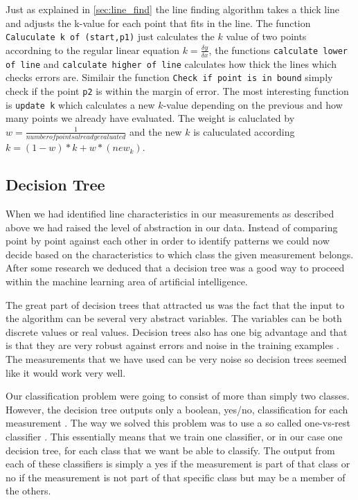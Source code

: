 \documentclass[a4paper, 10pt, conference]{ieeeconf}      %
\begin{document}
Just as explained in \ref{sec:line_find} the line finding algorithm takes a thick line and adjusts the k-value for each point that fits in the line. The function \texttt{Caluculate k of (start,p1)} just calculates the $k$ value of two points accordning to the regular linear equation $k = \frac{\delta y}{\delta x}$, the functions \texttt{calculate lower of line} and \texttt{calculate higher of line} calculates how thick the lines which checks errors are. Similair the function \texttt{Check if point is in bound} simply check if the point \texttt{p2} is within the margin of error. The most interesting function is \texttt{update k} which calculates a new $k$-value depending on the previous and how many points we already have evaluated. The weight is caluclated by $w = \frac{1}{number of points already evaluated}$ and the new $k$ is caluculated according $k = (1-w)*k + w*(new_k)$.

\subsection{Decision Tree}
When we had identified line characteristics in our measurements as described above we had raised the level of abstraction in our data. Instead of comparing point by point against each other in order to identify patterns we could now decide based on the characteristics to which class the given measurement belongs. After some research we deduced that a decision tree was a good way to proceed within the machine learning area of artificial intelligence.

The great part of decision trees that attracted us was the fact that the input to the algorithm can be several very abstract variables. The variables can be both discrete values or real values. Decision trees also has one big advantage and that is that they are very robust against errors and noise in the training examples \cite{ml3}. The measurements that we have used can be very noise so decision trees seemed like it would work very well.

Our classification problem were going to consist of more than simply two classes. However, the decision tree outputs only a boolean, yes/no, classification for each measurement \cite{ml3}. The way we solved this problem was to use a so called one-vs-rest classifier \cite{praml}. This essentially means that we train one classifier, or in our case one decision tree, for each class that we want be able to classify. The output from each of these classifiers is simply a yes if the measurement is part of that class or no if the measurement is not part of that specific class but may be a member of the others.
\end{document}
